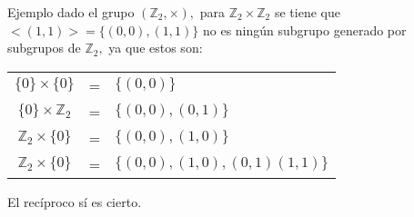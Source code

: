 \documentclass[12pt]{article}
\begin{document}
Ejemplo dado el grupo $(\mathbb Z_2, \times),$ para $\mathbb Z_2 \times \mathbb Z_2$ se tiene que $<(1,1)>= \{(0,0),(1,1)\}$
no es ningún subgrupo generado por subgrupos de $\mathbb Z_2,$ ya que 
estos son: 
\begin{center}
    \begin{tabular}{c c l}
$\{0\} \times \{0\}$ & = &$ \{(0,0)\}$ \\
$\{0\} \times \mathbb Z_2$ & = &$ \{(0,0),(0,1)\}$ \\
$\mathbb{Z}_2 \times \{0\}$ & = &$ \{(0,0),(1,0)\}$ \\
$\mathbb{Z}_2 \times \{0\}$ & = &$ \{(0,0),(1,0),(0,1)(1,1)\}$    
    \end{tabular}
\end{center}

El recíproco sí es cierto.
\end{document}
